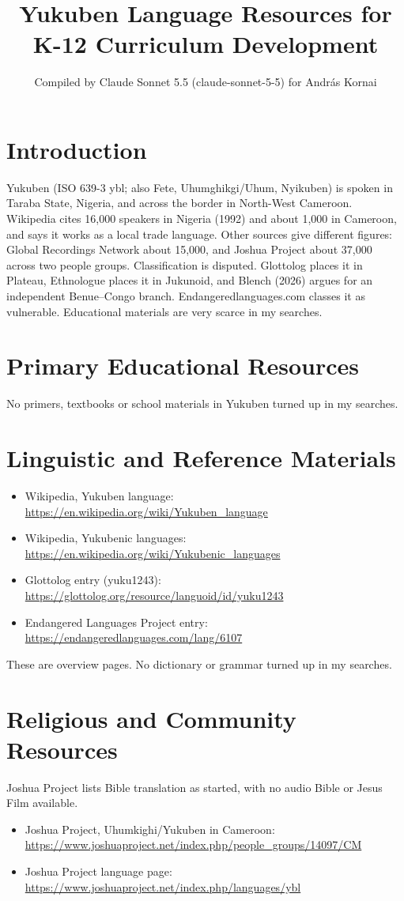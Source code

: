 \documentclass[12pt]{article}
\title{Yukuben Language Resources for K-12 Curriculum Development}
\author{Compiled by Claude Sonnet 5.5 (claude-sonnet-5-5) for Andr\'as Kornai}
\date{}
\begin{document}
\maketitle

\section{Introduction}
Yukuben (ISO 639-3 ybl; also Fete, Uhumghikgi/Uhum, Nyikuben) is spoken in Taraba State, Nigeria, and across the border in North-West Cameroon. Wikipedia cites 16{,}000 speakers in Nigeria (1992) and about 1{,}000 in Cameroon, and says it works as a local trade language. Other sources give different figures: Global Recordings Network about 15{,}000, and Joshua Project about 37{,}000 across two people groups. Classification is disputed. Glottolog places it in Plateau, Ethnologue places it in Jukunoid, and Blench (2026) argues for an independent Benue--Congo branch. Endangeredlanguages.com classes it as vulnerable. Educational materials are very scarce in my searches.

\section{Primary Educational Resources}
No primers, textbooks or school materials in Yukuben turned up in my searches.

\section{Linguistic and Reference Materials}
\begin{itemize}
\item Wikipedia, Yukuben language: \url{https://en.wikipedia.org/wiki/Yukuben_language}
\item Wikipedia, Yukubenic languages: \url{https://en.wikipedia.org/wiki/Yukubenic_languages}
\item Glottolog entry (yuku1243): \url{https://glottolog.org/resource/languoid/id/yuku1243}
\item Endangered Languages Project entry: \url{https://endangeredlanguages.com/lang/6107}
\end{itemize}
These are overview pages. No dictionary or grammar turned up in my searches.

\section{Religious and Community Resources}
Joshua Project lists Bible translation as started, with no audio Bible or Jesus Film available.
\begin{itemize}
\item Joshua Project, Uhumkighi/Yukuben in Cameroon: \url{https://www.joshuaproject.net/index.php/people_groups/14097/CM}
\item Joshua Project language page: \url{https://www.joshuaproject.net/index.php/languages/ybl}
\end{itemize}
\end{document}
